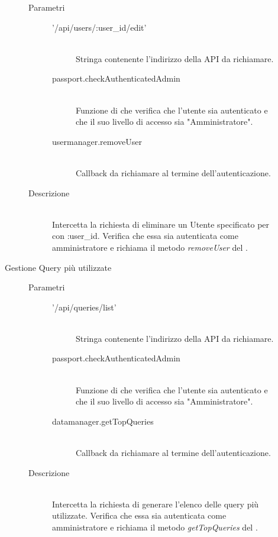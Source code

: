 \begin{description}
\begin{description}
\begin{mldescription}
     \hfill 
    \begin{description}
    \item[Parametri] \hfill
     \begin{description}
      \item['/api/users/:user\_id/edit'] \hfill \\
      Stringa contenente l'indirizzo della API da richiamare.
      \item[passport.checkAuthenticatedAdmin] \hfill \\
      Funzione di  che verifica che l'utente sia autenticato e che il suo livello di accesso sia "Amministratore".
      \item[usermanager.removeUser] \hfill \\
      Callback da richiamare al termine dell'autenticazione.
     \end{description}
    \item[Descrizione] \hfill \\
    Intercetta la richiesta di eliminare un Utente specificato per con :user\_id. Verifica che essa sia autenticata come amministratore e richiama il metodo \textit{removeUser} del . 
  \end{description}
  
  \end{mldescription}    
 
 \item[Gestione Query più utilizzate]
 \begin{mldescription}
     \hfill 
    \begin{description}
    \item[Parametri] \hfill
     \begin{description}
      \item['/api/queries/list'] \hfill \\
      Stringa contenente l'indirizzo della API da richiamare.
      \item[passport.checkAuthenticatedAdmin] \hfill \\
      Funzione di  che verifica che l'utente sia autenticato e che il suo livello di accesso sia "Amministratore".
      \item[datamanager.getTopQueries] \hfill \\
      Callback da richiamare al termine dell'autenticazione.
     \end{description}
    \item[Descrizione] \hfill \\
    Intercetta la richiesta di generare l'elenco delle query più utilizzate. Verifica che essa sia autenticata come amministratore e richiama il metodo \textit{getTopQueries} del .
    \end{description}
    

\end{mldescription}
\end{description}
\end{description}
